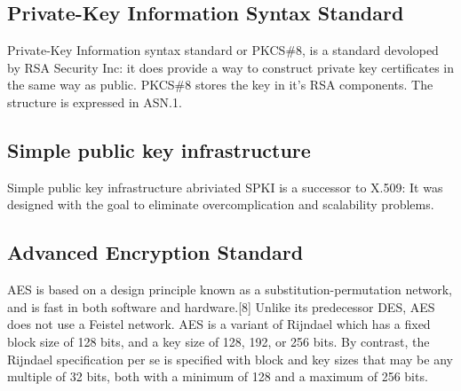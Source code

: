 \subsection{Private-Key Information Syntax Standard}
Private-Key Information syntax standard or PKCS\#8, is a standard devoloped by RSA Security Inc: it does provide a way to construct private key certificates in the same way as public.
PKCS\#8 stores the key in it's RSA components.
The structure is expressed in ASN.1.
\subsection{Simple public key infrastructure}
Simple public key infrastructure abriviated SPKI is a successor to X.509:
It was designed with the goal to eliminate overcomplication and scalability problems.
\subsection{Advanced Encryption Standard}
AES is based on a design principle known as a substitution-permutation network, and is fast in both software and hardware.[8] Unlike its predecessor DES, AES does not use a Feistel network. AES is a variant of Rijndael which has a fixed block size of 128 bits, and a key size of 128, 192, or 256 bits. By contrast, the Rijndael specification per se is specified with block and key sizes that may be any multiple of 32 bits, both with a minimum of 128 and a maximum of 256 bits.
\cite{AESISFAST:Online}
